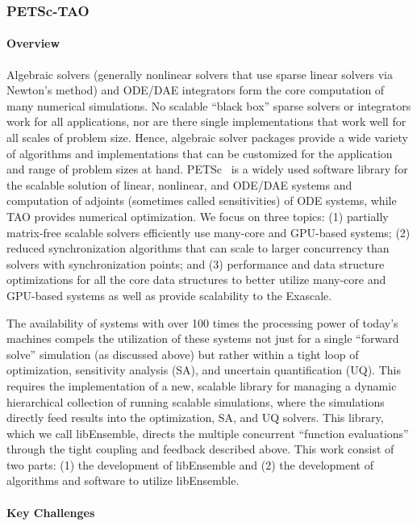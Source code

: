 \subsubsection{ PETSc-TAO} \label{subsubsect:petsc}
\paragraph{Overview} 

Algebraic solvers (generally nonlinear solvers that use sparse linear solvers via Newton's method) and ODE/DAE 
integrators form the core computation of many numerical simulations. No scalable ``black box'' sparse solvers 
or integrators work for all applications, nor are there single implementations that work well for all scales of 
problem size. Hence, algebraic solver packages provide a wide variety of algorithms and implementations 
that can be customized for the application and range of problem sizes at hand. PETSc~\cite{petsc:homepage,petsc-man} 
is a widely used software library for the scalable solution of linear, nonlinear, and ODE/DAE systems and 
computation of adjoints (sometimes called sensitivities) of ODE systems, while TAO provides numerical optimization. 
We focus on three topics: (1) partially 
matrix-free scalable solvers efficiently use many-core and GPU-based systems; (2) reduced synchronization 
algorithms that can scale to larger concurrency than solvers with synchronization points; and (3) performance 
and data structure optimizations for all the core data structures to better utilize many-core and GPU-based 
systems as well as provide scalability to the Exascale.

The availability of systems with over 100 times the processing power of today's machines compels the utilization 
of these systems not just for a single ``forward solve'' simulation (as discussed above) but rather within a 
tight loop of optimization, sensitivity analysis (SA), and uncertain quantification (UQ). This requires the 
implementation of a new, scalable library for managing a dynamic hierarchical collection of running scalable 
simulations, where the simulations directly feed results into the optimization, SA, and UQ solvers.  This library, 
which we call libEnsemble, directs the multiple concurrent ``function evaluations'' through the tight coupling 
and feedback described above. This work consist of two parts: (1) the development of libEnsemble and (2) the 
development of algorithms and software to utilize libEnsemble.

\paragraph{Key Challenges}

